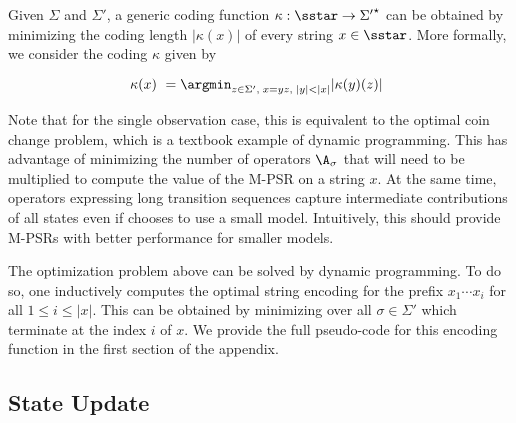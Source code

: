 Given $\Sigma$ and $\Sigma'$, a generic coding function $\kappa : \sstar \to {\Sigma'}^\star$ can be obtained by minimizing the coding length $|\kappa(x)|$ of every string $x \in \sstar$. More formally, we consider the coding $\kappa$ given by

\begin{equation*}
\kappa(x) ~= \argmin_{ z \in \Sigma', \; x=yz, \; |y|<|x|} |\kappa(y)(z)| \enspace 
\end{equation*}

Note that for the single observation case, this is equivalent to the optimal coin change problem, which is a textbook example of dynamic programming. This has advantage of minimizing the number of operators $\A_\sigma$ that will need to be multiplied to compute the value of the M-PSR on a string $x$. At the same time, operators expressing long transition sequences capture intermediate contributions of all states even if chooses to use a small model. Intuitively, this should provide M-PSRs with better performance for smaller models.  




%

The optimization problem above can be solved by dynamic programming. To do so, one inductively computes the optimal string encoding for the prefix $x_1 \cdots x_i$ for all $1 \leq i \leq |x|$. This can be obtained by minimizing over all $\sigma \in \Sigma'$ which terminate at the index $i$ of $x$. We provide the full pseudo-code for this encoding function in the first section of the appendix.

\subsection{State Update}

